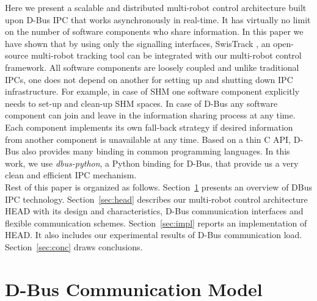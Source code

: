 \documentclass{ifacconf}
\begin{document}
Here we present a scalable and distributed multi-robot control architecture built upon D-Bus IPC that works asynchronously in real-time. It has virtually no limit on the number of software components who  share information. In this paper we have shown that by using only the signalling interfaces, SwisTrack \citep{Lochmatter+2008}, an open-source multi-robot tracking tool can be integrated with our multi-robot control framework. All software components are loosely coupled and unlike traditional IPCs, one does not depend on another for setting up and shutting down IPC infrastructure. For example, in case of SHM one software component explicitly needs to set-up and clean-up SHM spaces. In case of D-Bus any software component can join and leave in the information sharing process at any time. Each component implements its own fall-back strategy if desired information from another component is unavailable at any time. Based on a thin C API, D-Bus also provides many binding in common programming languages. In this work, we use {\em dbus-python}, a Python binding for D-Bus, that provide us a very clean and efficient IPC mechanism.\\
Rest of this paper is organized as follows. Section~\ref{sec:dbus} presents an overview of DBus IPC technology.  Section~\ref{sec:head} describes our multi-robot control architecture HEAD with its design and characteristics, D-Bus communication interfaces and flexible communication schemes.  Section~\ref{sec:impl} reports an implementation of HEAD. It also includes  our experimental results of D-Bus communication load. Section~\ref{sec:conc} draws conclusions.
\section{D-Bus Communication Model}
\label{sec:dbus}
\end{document}
